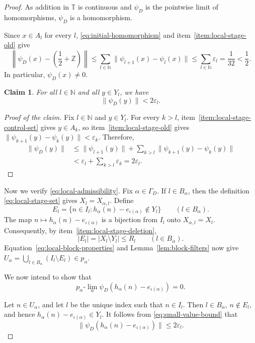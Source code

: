 \documentclass[11pt]{amsart}
\newtheorem*{claim}{Claim}
\theoremstyle{definition}
\newcommand{\T}{\mathbb T}
\newcommand{\N}{\mathbb N}
\newcommand{\Z}{\mathbb Z}
\begin{document}
\begin{proof}
As addition in $\T$ is continuous and $\psi_D$ is the pointwise limit of
homomorphisms, $\psi_D$ is a homomorphism.

Since $x\in A_l$ for every $l$,
\eqref{eq:initial-homomorphism} and
item~\ref{item:local-stage-old} give
\[
 \left\|\psi_D(x)-\left(\frac12+\Z\right)\right\|
 \leq
 \sum_{l\in\N}\|\psi_{l+1}(x)-\psi_l(x)\|
 \leq
 \sum_{l\in\N}\varepsilon_l
 =\frac1{32}<\frac12.
\]
In particular, $\psi_D(x)\neq0$.

\begin{claim}
For all $l\in\N$ and all $y\in Y_l$, we have
\begin{equation}\label{eq:small-value-bound}
 \|\psi_D(y)\|<2\varepsilon_l.
\end{equation}
\end{claim}
\begin{proof}[Proof of the claim]
Fix $l\in\N$ and $y\in Y_l$.  For every $k>l$,
item~\ref{item:local-stage-control-set} gives $y\in A_k$, so
item~\ref{item:local-stage-old} gives
$\|\psi_{k+1}(y)-\psi_k(y)\|<\varepsilon_k$.  Therefore,
\begin{align*}
 \|\psi_D(y)\|
 &\leq
 \|\psi_{l+1}(y)\|+\sum_{k>l}\|\psi_{k+1}(y)-\psi_k(y)\|\\
 &<\varepsilon_l+\sum_{k>l}\varepsilon_k=2\varepsilon_l.
\end{align*}
\end{proof}

Now we verify \eqref{eq:local-admissibility}.  Fix
$\alpha\in\Gamma_D$.  If $l\in B_\alpha$, then the definition
\eqref{eq:local-stage-set} gives $X_l=X_{\alpha,l}$.  Define
\[
 E_l
 =
 \{n\in I_l:h_\alpha(n)-e_{\iota(\alpha)}\notin Y_l\}
 \qquad(l\in B_\alpha).
\]
The map $n\longmapsto h_\alpha(n)-e_{\iota(\alpha)}$
is a bijection from $I_l$ onto $X_{\alpha,l}=X_l$.  Consequently, by
item~\ref{item:local-stage-deletion},
\[
 |E_l|
 =
 |X_l\setminus Y_l|
 \leq R_l
 \qquad(l\in B_\alpha).
\]
Equation~\eqref{eq:local-block-properties} and
Lemma~\ref{lem:block-filters} now give
$\displaystyle
 U_\alpha
 =
 \bigcup_{l\in B_\alpha}(I_l\setminus E_l)
 \in p_\alpha.
$

We now intend to show that
\begin{equation}\label{eq:local-limit}
 p_\alpha\text{-}\lim_n
 \psi_D(h_\alpha(n)-e_{\iota(\alpha)})
 =0.
\end{equation}

Let $n\in U_\alpha$, and let $l$ be the unique index such that
$n\in I_l$.  Then $l\in B_\alpha$, $n\notin E_l$, and hence
$h_\alpha(n)-e_{\iota(\alpha)}\in Y_l$.
It follows from \eqref{eq:small-value-bound} that
\begin{equation}\label{eq:block-limit-estimate}
 \|\psi_D(h_\alpha(n)-e_{\iota(\alpha)})\|
 \leq 2\varepsilon_l.
\end{equation}


\end{proof}
\end{document}
